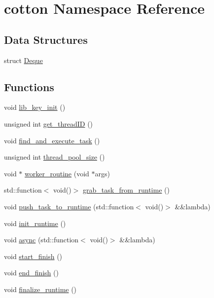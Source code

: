 \hypertarget{namespacecotton}{}\section{cotton Namespace Reference}
\label{namespacecotton}
\subsection*{Data Structures}
\begin{DoxyCompactItemize}
\item 
struct \mbox{\hyperlink{structcotton_1_1Deque}{Deque}}
\end{DoxyCompactItemize}
\subsection*{Functions}
\begin{DoxyCompactItemize}
\item 
void \mbox{\hyperlink{namespacecotton_a4ea9036584fa3bd86fe8626dc05d295f}{lib\+\_\+key\+\_\+init}} ()
\item 
unsigned int \mbox{\hyperlink{namespacecotton_ab1ebe1f6821a54e7c4911c22acebff8a}{get\+\_\+thread\+ID}} ()
\item 
void \mbox{\hyperlink{namespacecotton_af22caee9434a7e06a09b2f9a0417c1eb}{find\+\_\+and\+\_\+execute\+\_\+task}} ()
\item 
unsigned int \mbox{\hyperlink{namespacecotton_a0b32dd3b6a3d126e107d5c77ec1f4cc3}{thread\+\_\+pool\+\_\+size}} ()
\item 
void $\ast$ \mbox{\hyperlink{namespacecotton_a361c34063ecb68cf02d417074decb12b}{worker\+\_\+routine}} (void $\ast$args)
\item 
std\+::function$<$ void()$>$ \mbox{\hyperlink{namespacecotton_afaca8aa46092d066bf1d996ae09fb83d}{grab\+\_\+task\+\_\+from\+\_\+runtime}} ()
\item 
void \mbox{\hyperlink{namespacecotton_a2b2001813bd051cd1ff41a75989667c0}{push\+\_\+task\+\_\+to\+\_\+runtime}} (std\+::function$<$ void()$>$ \&\&lambda)
\item 
void \mbox{\hyperlink{namespacecotton_ae391d31cf35efbf9e644206001d7fc6d}{init\+\_\+runtime}} ()
\item 
void \mbox{\hyperlink{namespacecotton_a3a7e86503c4fd0c48774e2ffc43d947a}{async}} (std\+::function$<$ void()$>$ \&\&lambda)
\item 
void \mbox{\hyperlink{namespacecotton_aae085573bf6951565449c429ac59c43c}{start\+\_\+finish}} ()
\item 
void \mbox{\hyperlink{namespacecotton_ab413e05e91ff6e4918aa9aa63d52b2ff}{end\+\_\+finish}} ()
\item 
void \mbox{\hyperlink{namespacecotton_a3061b2929300562580e4bf1416372c3f}{finalize\+\_\+runtime}} ()
\end{DoxyCompactItemize}



